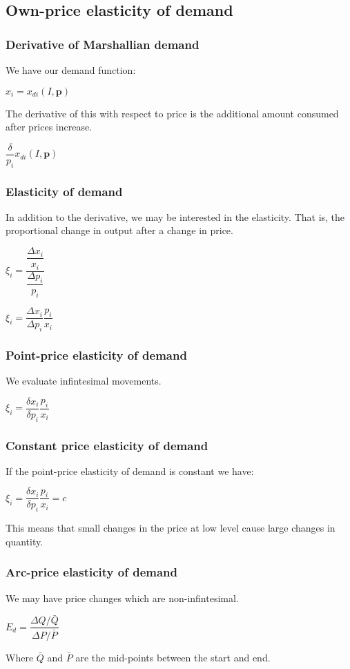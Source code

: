 
\subsection{Own-price elasticity of demand}

\subsubsection{Derivative of Marshallian demand}

We have our demand function:

\(x_i=x_{di}(I, \mathbf p)\)

The derivative of this with respect to price is the additional amount consumed after prices increase.

\(\dfrac{\delta }{p_i}x_{di}(I, \mathbf p)\)

\subsubsection{Elasticity of demand}

In addition to the derivative, we may be interested in the elasticity. That is, the proportional change in output after a change in price.

\(\xi_i =\dfrac{\dfrac{\Delta x_i}{x_i}}{\dfrac{\Delta p_i}{p_i}}\)

\(\xi_i =\dfrac{\Delta x_i}{\Delta p_i}\dfrac{p_i}{x_i}\)

\subsubsection{Point-price elasticity of demand}

We evaluate infintesimal movements.

\(\xi_i =\dfrac{\delta x_i}{\delta p_i}\dfrac{p_i}{x_i}\)

\subsubsection{Constant price elasticity of demand}

If the point-price elasticity of demand is constant we have:

\(\xi_i =\dfrac{\delta x_i}{\delta p_i}\dfrac{p_i}{x_i}=c\)

This means that small changes in the price at low level cause large changes in quantity.

\subsubsection{Arc-price elasticity of demand}

We may have price changes which are non-infintesimal.

\(E_d=\dfrac{\Delta Q/\bar Q}{\Delta P/\bar P}\)

Where \(\bar Q\) and \(\bar P\) are the mid-points between the start and end.

